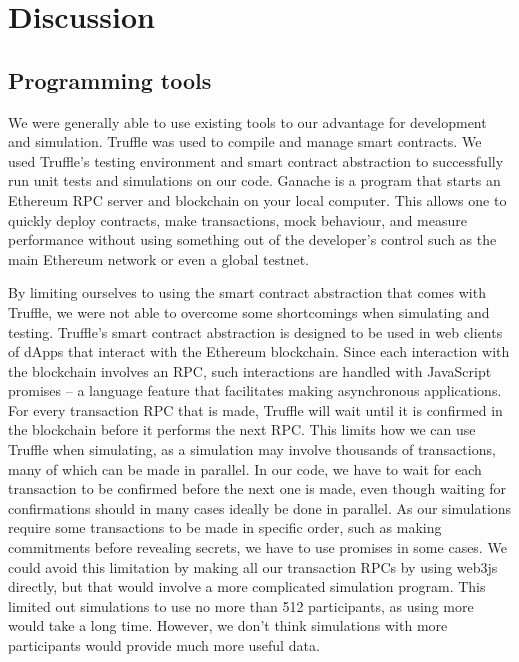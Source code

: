 \chapter{Discussion}
\label{chap:discussion}


\section{Programming tools}
\label{sec:tools}

We were generally able to use existing tools to our advantage for development and simulation. Truffle was used to compile and manage smart contracts. We used Truffle's testing environment and smart contract abstraction to successfully run unit tests and simulations on our code. Ganache is a program that starts an Ethereum RPC server and blockchain on your local computer. This allows one to quickly deploy contracts, make transactions, mock behaviour, and measure performance without using something out of the developer's control such as the main Ethereum network or even a global testnet.

By limiting ourselves to using the smart contract abstraction that comes with Truffle, we were not able to overcome some shortcomings when simulating and testing. Truffle's smart contract abstraction is designed to be used in web clients of dApps that interact with the Ethereum blockchain. Since each interaction with the blockchain involves an RPC, such interactions are handled with JavaScript promises – a language feature that facilitates making asynchronous applications. For every transaction RPC that is made, Truffle will wait until it is confirmed in the blockchain before it performs the next RPC. This limits how we can use Truffle when simulating, as a simulation may involve thousands of transactions, many of which can be made in parallel. In our code, we have to wait for each transaction to be confirmed before the next one is made, even though waiting for confirmations should in many cases ideally be done in parallel. As our simulations require some transactions to be made in specific order, such as making commitments before revealing secrets, we have to use promises in some cases. We could avoid this limitation by making all our transaction RPCs by using web3js directly, but that would involve a more complicated simulation program. This limited out simulations to use no more than 512 participants, as using more would take a long time. However, we don't think simulations with more participants would provide much more useful data.

